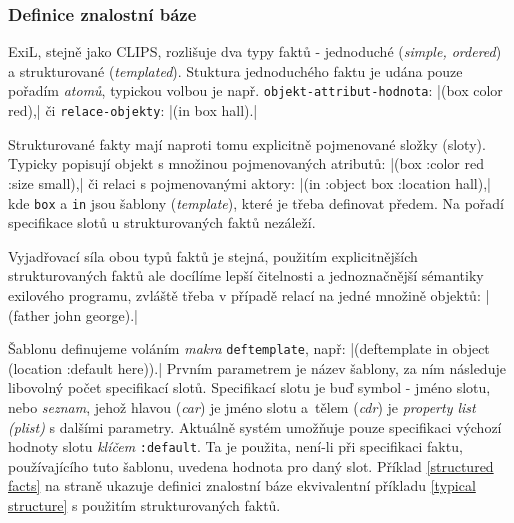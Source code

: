 \subsubsection{Definice znalostní báze}
\label{knowledge base definition}

ExiL, stejně jako CLIPS, rozlišuje dva typy faktů - jednoduché (\emph{simple,
ordered}) a strukturované (\emph{templated}). Stuktura jednoduchého faktu je udána
pouze pořadím \emph{atomů}, typickou volbou je např. \verb|objekt-attribut-hodnota|:
\cl|(box color red),| či \verb|relace-objekty|: \cl|(in box hall).|

Strukturované fakty mají naproti tomu explicitně pojmenované složky (sloty).
Typicky popisují objekt s množinou pojmenovaných atributů: \cl|(box :color red :size small),|
či relaci s pojmenovanými aktory: \cl|(in :object box :location hall),| kde
\verb|box| a \verb|in| jsou šablony (\emph{template}), které je třeba definovat
předem. Na pořadí specifikace slotů u strukturovaných faktů
nezáleží.

Vyjadřovací síla obou typů faktů je stejná, použitím explicitnějších
strukturovaných faktů ale docílíme lepší čitelnosti a jednoznačnější sémantiky
exilového programu, zvláště třeba v případě relací na jedné množině objektů:
\cl|(father john george).|

Šablonu definujeme voláním \emph{makra} \verb|deftemplate|, např:
\cl|(deftemplate in object (location :default here)).| Prvním parametrem je
název šablony, za ním následuje libovolný počet specifikací slotů. Specifikací
slotu je buď symbol - jméno slotu, nebo \emph{seznam}, jehož hlavou
(\emph{car}) je jméno slotu a~tělem (\emph{cdr}) je \emph{property list (plist)}
s dalšími parametry. Aktuálně systém umožňuje pouze specifikaci výchozí hodnoty
slotu \emph{klíčem} \verb|:default|. Ta je použita, není-li při specifikaci
faktu, používajícího tuto šablonu, uvedena hodnota pro daný slot. Příklad
\ref{structured facts} na straně \pageref{structured facts} ukazuje definici
znalostní báze ekvivalentní příkladu \ref{typical structure} s použitím
strukturovaných faktů.

